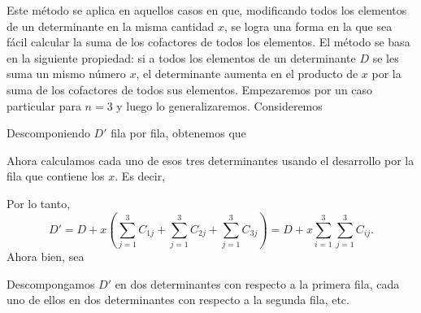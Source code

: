 Este método se aplica en aquellos casos en que, modificando todos los elementos de un determinante en la misma cantidad $x$, se logra una forma en la que sea fácil calcular la suma de los cofactores de todos los elementos. El método se basa en la siguiente propiedad: si a todos los elementos de un determinante $D$ se les suma un mismo número $x$, el determinante aumenta en el producto de $x$ por la suma de los cofactores de todos sus elementos. Empezaremos por un caso particular para $n = 3$ y luego lo generalizaremos. Consideremos
\begin{matrizn}
\end{matrizn}
Descomponiendo $D'$ fila por fila, obtenemos que
\begin{matrizn}
\end{matrizn}
Ahora calculamos cada uno de esos tres determinantes usando el desarrollo por la fila que contiene los $x$. Es decir,
\begin{matrizn}
\end{matrizn}
Por lo tanto,
$$D' = D + x\left(\sum_{j=1}^3 C_{1j} + \sum_{j=1}^3 C_{2j} + \sum_{j=1}^3 C_{3j}\right)
= D + x\sum_{i=1}^3\sum_{j=1}^3 C_{ij}.$$
Ahora bien, sea
\begin{matrizn}
\end{matrizn}
Descompongamos $D'$ en dos determinantes con respecto a la primera fila, cada uno de ellos en dos determinantes con respecto a la segunda fila, etc.

